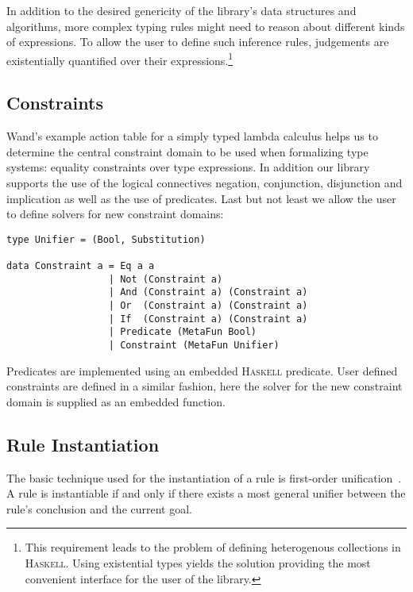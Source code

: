 In addition to the desired genericity of the library's data structures
and algorithms, more complex typing rules might need to reason about
different kinds of expressions. To allow the user to define such
inference rules, judgements are existentially quantified over their
expressions.\footnote{ This requirement leads to the problem of
  defining heterogenous collections in \textsc{Haskell}. Using
  existential types yields the solution providing the most convenient
  interface for the user of the library. }

\subsection{Constraints}

Wand's example action table for a simply typed lambda calculus helps
us to determine the central constraint domain to be used when
formalizing type systems: equality constraints over type
expressions. In addition our library supports the use of the logical
connectives negation, conjunction, disjunction and implication as well
as the use of predicates. Last but not least we allow the user to
define solvers for new constraint domains:
\begin{lstlisting}
type Unifier = (Bool, Substitution)

data Constraint a = Eq a a
                  | Not (Constraint a)
                  | And (Constraint a) (Constraint a)
                  | Or  (Constraint a) (Constraint a)
                  | If  (Constraint a) (Constraint a)
                  | Predicate (MetaFun Bool)
                  | Constraint (MetaFun Unifier)
\end{lstlisting}
Predicates are implemented using an embedded \textsc{Haskell}
predicate. User defined constraints are defined in a similar fashion,
here the solver for the new constraint domain is supplied as an
embedded function.

\subsection{Rule Instantiation}

The basic technique used for the instantiation of a rule is
first-order unification~\cite{Robinson65}. A rule is instantiable if
and only if there exists a most general unifier between the rule's
conclusion and the current goal.

